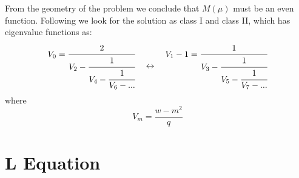 From the geometry of the problem we conclude that $ M(\mu) $ must be an even function.  Following \cite{Mathieu4} we look for the solution as class I and class II, which has eigenvalue functions as:
\begin{equation}
\begin{split}
V_0 = \cfrac{2}{V_2 - \cfrac{1}{V_4 - \cfrac{1}{V_6 - ...}}}
\end{split}
\quad\leftrightarrow\quad
\begin{split}
V_1 - 1 = \cfrac{1}{V_3 - \cfrac{1}{V_5 - \cfrac{1}{V_7 - ...}}}
\end{split}
\end{equation}
where 
\begin{equation}
V_m = \frac{w - m^2}{q}
\end{equation}

\section{L Equation}

